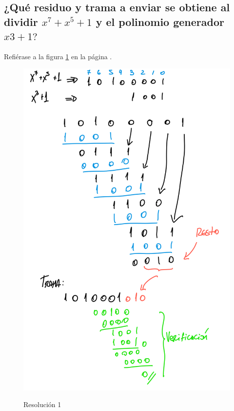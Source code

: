 \documentclass[11pt]{utalcaDoc}
\begin{document}
\subsection{¿Qué residuo y trama a enviar se obtiene al dividir $x^7 + x^5 + 1$ y el polinomio generador $x3 + 1?$}
Refiérase a la figura \ref{FIG:resolucion1} en la página \pageref{FIG:resolucion1}.
\begin{figure}[ht]
	\centering
	\includegraphics[height=.6\textheight]{images/1}\\
	\caption{Resolución 1}
	\label{FIG:resolucion1}
\end{figure}
\end{document}
